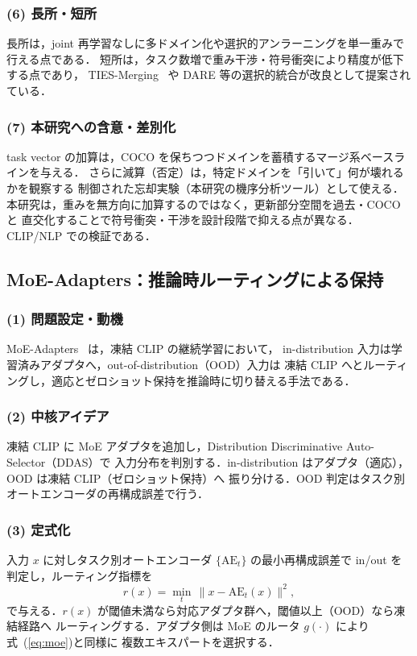 \subsubsection*{(6) 長所・短所}
長所は，joint 再学習なしに多ドメイン化や選択的アンラーニングを単一重みで行える点である．
短所は，タスク数増で重み干渉・符号衝突により精度が低下する点であり，
TIES-Merging~\cite{ties} や DARE 等の選択的統合が改良として提案されている．

\subsubsection*{(7) 本研究への含意・差別化}
task vector の加算は，COCO を保ちつつドメインを蓄積するマージ系ベースラインを与える．
さらに減算（否定）は，特定ドメインを「引いて」何が壊れるかを観察する
制御された忘却実験（本研究の機序分析ツール）として使える．
本研究は，重みを無方向に加算するのではなく，更新部分空間を過去・COCO と
直交化することで符号衝突・干渉を設計段階で抑える点が異なる．CLIP/NLP での検証である．

\subsection{MoE-Adapters：推論時ルーティングによる保持}
\label{sub:moeadapters}

\subsubsection*{(1) 問題設定・動機}
MoE-Adapters~\cite{moeadapters} は，凍結 CLIP の継続学習において，
in-distribution 入力は学習済みアダプタへ，out-of-distribution（OOD）入力は
凍結 CLIP へとルーティングし，適応とゼロショット保持を推論時に切り替える手法である．

\subsubsection*{(2) 中核アイデア}
凍結 CLIP に MoE アダプタを追加し，Distribution Discriminative Auto-Selector（DDAS）で
入力分布を判別する．in-distribution はアダプタ（適応），OOD は凍結 CLIP（ゼロショット保持）へ
振り分ける．OOD 判定はタスク別オートエンコーダの再構成誤差で行う．

\subsubsection*{(3) 定式化}
入力 $x$ に対しタスク別オートエンコーダ $\{\mathrm{AE}_t\}$ の最小再構成誤差で
in/out を判定し，ルーティング指標を
\begin{equation}
r(x) = \min_{t}\, \bigl\| x - \mathrm{AE}_t(x) \bigr\|^{2},
\label{eq:ddas}
\end{equation}
で与える．$r(x)$ が閾値未満なら対応アダプタ群へ，閾値以上（OOD）なら凍結経路へ
ルーティングする．アダプタ側は MoE のルータ $g(\cdot)$ により式~(\ref{eq:moe})と同様に
複数エキスパートを選択する．

